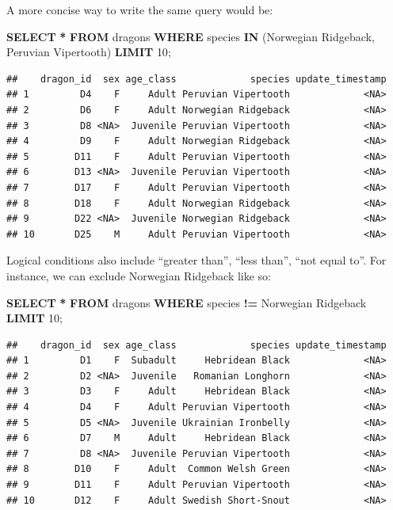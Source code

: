 \documentclass[
]{book}
\newenvironment{Shaded}{\begin{snugshade}}{\end{snugshade}}
\newcommand{\DecValTok}[1]{\textcolor[rgb]{0.00,0.00,0.81}{#1}}
\newcommand{\KeywordTok}[1]{\textcolor[rgb]{0.13,0.29,0.53}{\textbf{#1}}}
\newcommand{\NormalTok}[1]{#1}
\newcommand{\OperatorTok}[1]{\textcolor[rgb]{0.81,0.36,0.00}{\textbf{#1}}}
\newcommand{\StringTok}[1]{\textcolor[rgb]{0.31,0.60,0.02}{#1}}
\begin{document}
A more concise way to write the same query would be:

\begin{Shaded}
\begin{Highlighting}[]
\KeywordTok{SELECT} \OperatorTok{*} 
\KeywordTok{FROM}\NormalTok{ dragons}
\KeywordTok{WHERE}\NormalTok{ species }\KeywordTok{IN}\NormalTok{ (}\StringTok{\textquotesingle{}Norwegian Ridgeback\textquotesingle{}}\NormalTok{, }\StringTok{\textquotesingle{}Peruvian Vipertooth\textquotesingle{}}\NormalTok{)}
\KeywordTok{LIMIT} \DecValTok{10}\NormalTok{;}
\end{Highlighting}
\end{Shaded}

\begin{verbatim}
##    dragon_id  sex age_class             species update_timestamp
## 1         D4    F     Adult Peruvian Vipertooth             <NA>
## 2         D6    F     Adult Norwegian Ridgeback             <NA>
## 3         D8 <NA>  Juvenile Peruvian Vipertooth             <NA>
## 4         D9    F     Adult Norwegian Ridgeback             <NA>
## 5        D11    F     Adult Peruvian Vipertooth             <NA>
## 6        D13 <NA>  Juvenile Peruvian Vipertooth             <NA>
## 7        D17    F     Adult Peruvian Vipertooth             <NA>
## 8        D18    F     Adult Norwegian Ridgeback             <NA>
## 9        D22 <NA>  Juvenile Norwegian Ridgeback             <NA>
## 10       D25    M     Adult Peruvian Vipertooth             <NA>
\end{verbatim}

Logical conditions also include ``greater than'', ``less than'', ``not equal to''.
For instance, we can exclude Norwegian Ridgeback like so:

\begin{Shaded}
\begin{Highlighting}[]
\KeywordTok{SELECT} \OperatorTok{*} 
\KeywordTok{FROM}\NormalTok{ dragons}
\KeywordTok{WHERE}\NormalTok{ species }\OperatorTok{!=} \StringTok{\textquotesingle{}Norwegian Ridgeback\textquotesingle{}}
\KeywordTok{LIMIT} \DecValTok{10}\NormalTok{;}
\end{Highlighting}
\end{Shaded}

\begin{verbatim}
##    dragon_id  sex age_class             species update_timestamp
## 1         D1    F  Subadult     Hebridean Black             <NA>
## 2         D2 <NA>  Juvenile   Romanian Longhorn             <NA>
## 3         D3    F     Adult     Hebridean Black             <NA>
## 4         D4    F     Adult Peruvian Vipertooth             <NA>
## 5         D5 <NA>  Juvenile Ukrainian Ironbelly             <NA>
## 6         D7    M     Adult     Hebridean Black             <NA>
## 7         D8 <NA>  Juvenile Peruvian Vipertooth             <NA>
## 8        D10    F     Adult  Common Welsh Green             <NA>
## 9        D11    F     Adult Peruvian Vipertooth             <NA>
## 10       D12    F     Adult Swedish Short-Snout             <NA>
\end{verbatim}
\end{document}
